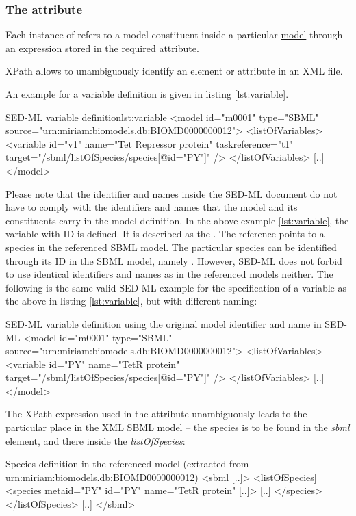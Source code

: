 \subsubsection{The  attribute}
\label{sec:target}
Each instance of  refers to a model constituent inside a particular \hyperref[class:model]{model}  through an  expression stored in the required  attribute. 

XPath allows to unambiguously identify an element or attribute in an XML file.

An example for a variable definition is given in listing \ref{lst:variable}.
%
\begin{myXmlLst}{SED-ML variable definition}{lst:variable}
<model id="m0001" type="SBML" source="urn:miriam:biomodels.db:BIOMD0000000012">
 <listOfVariables>
  <variable id="v1" name="Tet Repressor protein" taskreference="t1"  target="/sbml/listOfSpecies/species[@id="PY"]" />
 </listOfVariables>
 [..]
</model>
\end{myXmlLst}
%
Please note that the identifier and names inside the SED-ML document do not have to comply with the identifiers and names that the model and its constituents carry in the model definition. In the above example \ref{lst:variable}, the variable with ID  is defined. It is described as the . The reference points to a species in the referenced SBML model. The particular species can be identified through its ID in the SBML model, namely . However, SED-ML does not forbid to use identical identifiers and names as in the referenced models neither. The following is the same valid SED-ML example for the specification of a variable as the above in listing \ref{lst:variable}, but with different naming:
%
\begin{myXmlLst}{SED-ML variable definition using the original model identifier and name in SED-ML}{}
<model id="m0001" type="SBML" source="urn:miriam:biomodels.db:BIOMD0000000012">
 <listOfVariables>
  <variable id="PY" name="TetR protein" target="/sbml/listOfSpecies/species[@id="PY"]" />
 </listOfVariables>
 [..]
</model>
\end{myXmlLst}
%
 The XPath expression used in the  attribute unambiguously leads to the particular place in the XML SBML model -- the species is to be found in the \emph{sbml} element, and there inside the \emph{listOfSpecies}:
%
\begin{myXmlLst}{Species definition in the referenced model (extracted from \url{urn:miriam:biomodels.db:BIOMD0000000012})}{}
<sbml [..]>
 <listOfSpecies]
  <species metaid="PY" id="PY" name="TetR protein" [..]>
   [..]
  </species>
 </listOfSpecies>
 [..]
</sbml>
\end{myXmlLst}
%



